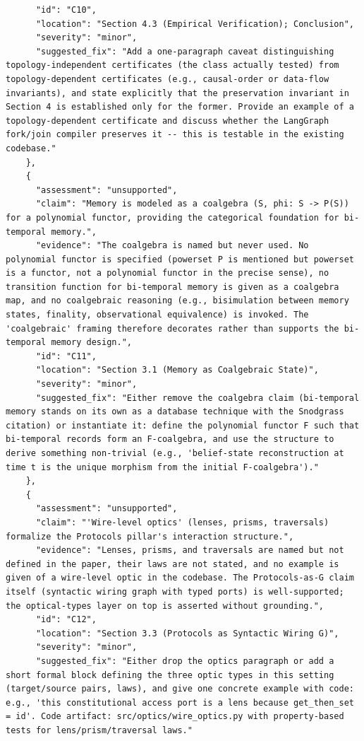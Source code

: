 \documentclass[11pt]{article}
\begin{document}
\begin{verbatim}
      "id": "C10",
      "location": "Section 4.3 (Empirical Verification); Conclusion",
      "severity": "minor",
      "suggested_fix": "Add a one-paragraph caveat distinguishing topology-independent certificates (the class actually tested) from topology-dependent certificates (e.g., causal-order or data-flow invariants), and state explicitly that the preservation invariant in Section 4 is established only for the former. Provide an example of a topology-dependent certificate and discuss whether the LangGraph fork/join compiler preserves it -- this is testable in the existing codebase."
    },
    {
      "assessment": "unsupported",
      "claim": "Memory is modeled as a coalgebra (S, phi: S -> P(S)) for a polynomial functor, providing the categorical foundation for bi-temporal memory.",
      "evidence": "The coalgebra is named but never used. No polynomial functor is specified (powerset P is mentioned but powerset is a functor, not a polynomial functor in the precise sense), no transition function for bi-temporal memory is given as a coalgebra map, and no coalgebraic reasoning (e.g., bisimulation between memory states, finality, observational equivalence) is invoked. The 'coalgebraic' framing therefore decorates rather than supports the bi-temporal memory design.",
      "id": "C11",
      "location": "Section 3.1 (Memory as Coalgebraic State)",
      "severity": "minor",
      "suggested_fix": "Either remove the coalgebra claim (bi-temporal memory stands on its own as a database technique with the Snodgrass citation) or instantiate it: define the polynomial functor F such that bi-temporal records form an F-coalgebra, and use the structure to derive something non-trivial (e.g., 'belief-state reconstruction at time t is the unique morphism from the initial F-coalgebra')."
    },
    {
      "assessment": "unsupported",
      "claim": "'Wire-level optics' (lenses, prisms, traversals) formalize the Protocols pillar's interaction structure.",
      "evidence": "Lenses, prisms, and traversals are named but not defined in the paper, their laws are not stated, and no example is given of a wire-level optic in the codebase. The Protocols-as-G claim itself (syntactic wiring graph with typed ports) is well-supported; the optical-types layer on top is asserted without grounding.",
      "id": "C12",
      "location": "Section 3.3 (Protocols as Syntactic Wiring G)",
      "severity": "minor",
      "suggested_fix": "Either drop the optics paragraph or add a short formal block defining the three optic types in this setting (target/source pairs, laws), and give one concrete example with code: e.g., 'this constitutional access port is a lens because get_then_set = id'. Code artifact: src/optics/wire_optics.py with property-based tests for lens/prism/traversal laws."

\end{verbatim}
\end{document}
